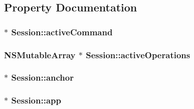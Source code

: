 \subsection{\-Property \-Documentation}
\hypertarget{interface_session_acb8b815de9ee21d93f6844ebb4477f64}{
\subsubsection[{active\-Command}]{ $\ast$ \-Session\-::active\-Command}}
\label{interface_session_acb8b815de9ee21d93f6844ebb4477f64}
\hypertarget{interface_session_a38dc8bbf3fe4bf8496f09986d969f3de}{
\subsubsection[{active\-Operations}]{\setlength{\rightskip}{0pt plus 5cm}\-N\-S\-Mutable\-Array $\ast$ \-Session\-::active\-Operations}}
\label{interface_session_a38dc8bbf3fe4bf8496f09986d969f3de}
\hypertarget{interface_session_aa00ac4bd991eccfa1e7326deaeb7986b}{
\subsubsection[{anchor}]{ $\ast$ \-Session\-::anchor}}
\label{interface_session_aa00ac4bd991eccfa1e7326deaeb7986b}
\hypertarget{interface_session_ac5daf9d3a0d566f529feeacf34783d56}{
\subsubsection[{app}]{ $\ast$ \-Session\-::app}}
